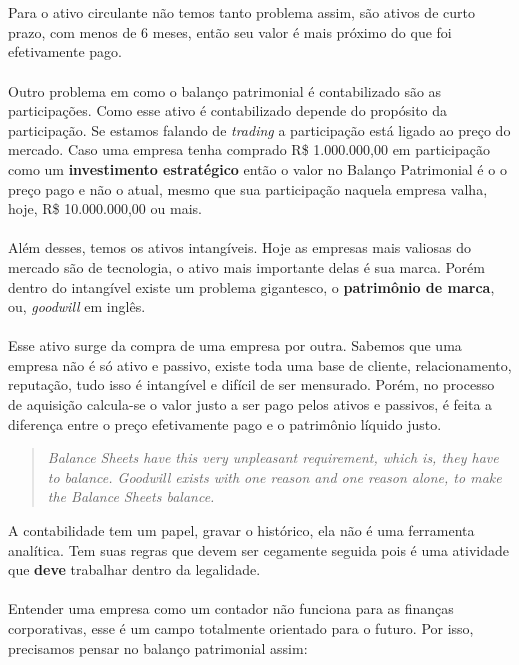 \\~\\
Para o ativo circulante não temos tanto problema assim, são ativos de curto prazo, com menos de 6 meses, então seu valor é mais próximo do que foi efetivamente pago.
\\~\\
Outro problema em como o balanço patrimonial é contabilizado são as participações. Como esse ativo é contabilizado depende do propósito da participação. Se estamos falando de \textit{trading} a participação está ligado ao preço do mercado. Caso uma empresa tenha comprado R\$ 1.000.000,00 em participação como um \textbf{investimento estratégico} então o valor no Balanço Patrimonial é o o preço pago e não o atual, mesmo que sua participação naquela empresa valha, hoje, R\$ 10.000.000,00 ou mais. 
\\~\\
Além desses, temos os ativos intangíveis. Hoje as empresas mais valiosas do mercado são de tecnologia, o ativo mais importante delas é sua marca. Porém dentro do intangível existe um problema gigantesco, o \textbf{patrimônio de marca}, ou, \textit{goodwill} em inglês.
\\~\\
Esse ativo surge da compra de uma empresa por outra. Sabemos que uma empresa não é só ativo e passivo, existe toda uma base de cliente, relacionamento, reputação, tudo isso é intangível e difícil de ser mensurado. Porém, no processo de aquisição calcula-se o valor justo a ser pago pelos ativos e passivos, é feita a diferença entre o preço efetivamente pago e o patrimônio líquido justo.
\begin{quote}
\textit{Balance Sheets have this very unpleasant requirement, which is, they have to balance. Goodwill exists with one reason and one reason alone, to make the Balance Sheets balance.}
\end{quote}

A contabilidade tem um papel, gravar o histórico, ela não é uma ferramenta analítica. Tem suas regras que devem ser cegamente seguida pois é uma atividade que \textbf{deve} trabalhar dentro da legalidade.
\\~\\
Entender uma empresa como um contador não funciona para as finanças corporativas, esse é um campo totalmente orientado para o futuro. Por isso, precisamos pensar no balanço patrimonial assim:

